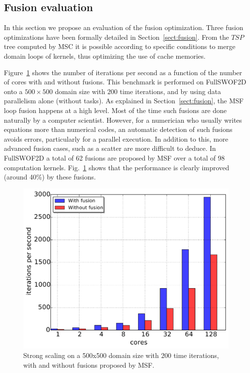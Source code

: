 \subsection{Fusion evaluation}
\label{sect:fus}

In this section we propose an evaluation of the fusion optimization. Three fusion optimizations have been formally detailed in Section~\ref{sect:fusion}. From the $TSP$ tree computed by MSC it is possible according to specific conditions to merge domain loops of kernels, thus optimizing the use of cache memories.

Figure~\ref{fig:fusion} shows the number of iterations per second as a function of the number of cores with and without fusions. This benchmark is performed on FullSWOF2D onto a $500 \times 500$ domain size with $200$ time iterations, and by using data parallelism alone (without tasks). As explained in Section~\ref{sect:fusion}, the MSF loop fusion happens at a high level. Most of the time such fusions are done naturally by a computer scientist. However, for a numerician who usually writes equations more than numerical codes, an automatic detection of such fusions avoids errors, particularly for a parallel execution. In addition to this, more advanced fusion cases, such as a scatter are more difficult to deduce. In FullSWOF2D a total of  62 fusions are proposed by MSF over a total of 98 computation kernels. Fig.~\ref{fig:fusion} shows that the performance is clearly improved (around 40\%) by these fusions.

\begin{figure}[!h]\begin{center}
  \includegraphics[width=.6\textwidth]{../results/task_scaling/500_200/fusVSbase.pdf}
  \caption{Strong scaling on a 500x500 domain size with $200$ time iterations, with and without fusions proposed by MSF.}
  \label{fig:fusion}
\end{center}\end{figure}

